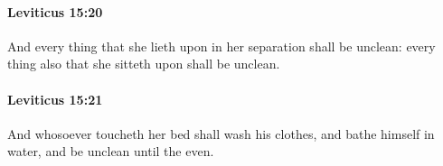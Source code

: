 		\paragraph{Leviticus 15:20} %
			\label{LEVITICUS-15-20}

			And every thing that she lieth upon in her separation shall be unclean: every thing also that she sitteth upon shall be unclean.


		\paragraph{Leviticus 15:21} %
			\label{LEVITICUS-15-21}

			And whosoever toucheth her bed shall wash his clothes, and bathe himself in water, and be unclean until the even.


